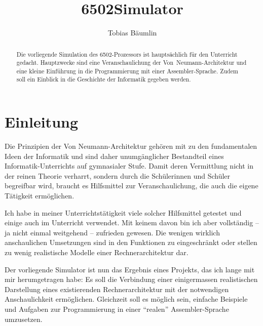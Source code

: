 \documentclass[11pt]{scrartcl}
\title{6502Simulator} \author{Tobias Bäumlin}
\begin{document}
\maketitle

\begin{abstract}
  Die vorliegende Simulation des 6502-Prozessors ist hauptsächlich für
  den Unterricht gedacht. Hauptzwecke sind eine Veranschaulichung der
  Von~Neu\-mann-Architektur und eine kleine Einführung in die
  Programmierung mit einer Assembler-Sprache. Zudem soll ein Einblick
  in die Geschichte der Informatik gegeben werden.
\end{abstract}

\tableofcontents{}

\newpage
\section{Einleitung}

Die Prinzipien der Von Neumann-Architektur gehören mit zu den
fundamentalen Ideen der Informatik und sind daher unumgänglicher
Bestandteil eines Informatik-Unterrichts auf gymnasialer Stufe. Damit
deren Vermittlung nicht in der reinen Theorie verharrt, sondern durch
die Schülerinnen und Schüler begreifbar wird, braucht es Hilfsmittel
zur Veranschaulichung, die auch die eigene Tätigkeit ermöglichen.

Ich habe in meiner Unterrichtstätigkeit viele solcher Hilfsmittel
getestet und einige auch im Unterricht verwendet. Mit keinem davon bin
ich aber vollständig -- ja nicht einmal weitgehend -- zufrieden
gewesen. Die wenigen wirklich anschaulichen Umsetzungen sind in den
Funktionen zu eingeschränkt oder stellen zu wenig realistische Modelle
einer Rechnerarchitektur dar.

Der vorliegende Simulator ist nun das Ergebnis eines Projekts, das ich
lange mit mir herumgetragen habe: Es soll die Verbindung einer
einigermassen realistischen Darstellung eines existierenden
Rechnerarchitektur mit der notwendigen Anschaulichkeit
ermöglichen. Gleichzeit soll es möglich sein, einfache Beispiele und
Aufgaben zur Programmierung in einer "`realen"' Assembler-Sprache
umzusetzen.
\end{document}
